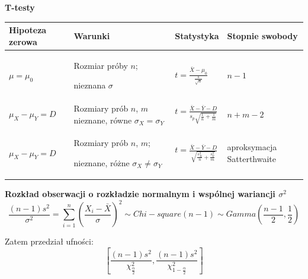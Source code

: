 \documentclass[12pt]{article}
\begin{document}
    \textbf{T-testy}

    \begin{table}[H]
        \begin{center}
            \begin{tabular}{ p{} |p{} |p{} |p{}}
                \toprule
                Hipoteza zerowa & Warunki & Statystyka & Stopnie swobody\\
                \toprule

                $\mu = \mu_0$ & Rozmiar próby $n$;

                nieznana $\sigma$ & $t = \frac{\bar{X} - \mu_0}{\frac{s}{\sqrt{n}}}$ & $n-1$\\

                \cmidrule(r){1-4}

                $\mu_X - \mu_Y = D$ & Rozmiary prób $n$, $m$
                nieznane, równe $\sigma_X = \sigma_Y$ & $t = \frac{\bar{X} - \bar{Y} - D}{s_p\sqrt{\frac{1}{n}+\frac{1}{m}}}$
                & $n+m-2$\\

                \cmidrule(r){1-4}

                $\mu_X - \mu_Y = D$ & Rozmiary prób $n$, $m$;

                nieznane, różne $\sigma_X \neq \sigma_Y$ & $t = \frac{\bar{X} - \bar{Y} - D}{\sqrt{\frac{s_X^2}{n} + \frac{s_Y^2}{m}}}$
                & aproksymacja Satterthwaite\\

                \bottomrule
            \end{tabular}
        \end{center}
    \end{table}

    \textbf{Rozkład obserwacji o rozkładzie normalnym i wspólnej wariancji $\sigma^2$}
    \begin{equation*}
        \frac{(n-1)s^2}{\sigma^2} = \sum_{i=1}^{n} \left ( \frac{X_i - \bar{X}}{\sigma} \right )^2 \sim Chi-square(n-1) \sim Gamma \left ( \frac{n-1}{2}, \frac{1}{2} \right )
    \end{equation*}

    Zatem przedział ufności:
    \begin{equation*}
        \left [ \frac{(n-1)s^2}{\chi^2_{\frac{\alpha}{2}}}, \frac{(n-1)s^2}{\chi_{1 - \frac{\alpha}{2}}^2} \right ]
    \end{equation*}
\end{document}
